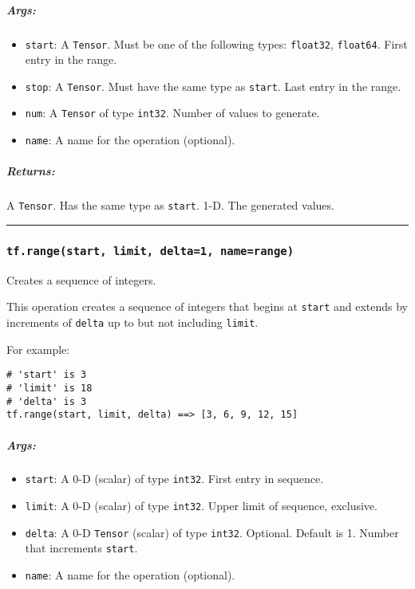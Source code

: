 \subparagraph{Args: }\label{args-6}

\begin{itemize}
\tightlist
\item
  \texttt{start}: A \texttt{Tensor}. Must be one of the following types:
  \texttt{float32}, \texttt{float64}. First entry in the range.
\item
  \texttt{stop}: A \texttt{Tensor}. Must have the same type as
  \texttt{start}. Last entry in the range.
\item
  \texttt{num}: A \texttt{Tensor} of type \texttt{int32}. Number of
  values to generate.
\item
  \texttt{name}: A name for the operation (optional).
\end{itemize}

\subparagraph{Returns: }\label{returns-6}

A \texttt{Tensor}. Has the same type as \texttt{start}. 1-D. The
generated values.

\begin{center}\rule{0.5\linewidth}{\linethickness}\end{center}

\subsubsection{\texorpdfstring{\texttt{tf.range(start,\ limit,\ delta=1,\ name=\textquotesingle{}range\textquotesingle{})}
}{tf.range(start, limit, delta=1, name='range') }}\label{tf.rangestart-limit-delta1-namerange}

Creates a sequence of integers.

This operation creates a sequence of integers that begins at
\texttt{start} and extends by increments of \texttt{delta} up to but not
including \texttt{limit}.

For example:

\begin{verbatim}
# 'start' is 3
# 'limit' is 18
# 'delta' is 3
tf.range(start, limit, delta) ==> [3, 6, 9, 12, 15]
\end{verbatim}

\subparagraph{Args: }\label{args-7}

\begin{itemize}
\tightlist
\item
  \texttt{start}: A 0-D (scalar) of type \texttt{int32}. First entry in
  sequence.
\item
  \texttt{limit}: A 0-D (scalar) of type \texttt{int32}. Upper limit of
  sequence, exclusive.
\item
  \texttt{delta}: A 0-D \texttt{Tensor} (scalar) of type \texttt{int32}.
  Optional. Default is 1. Number that increments \texttt{start}.
\item
  \texttt{name}: A name for the operation (optional).
\end{itemize}


